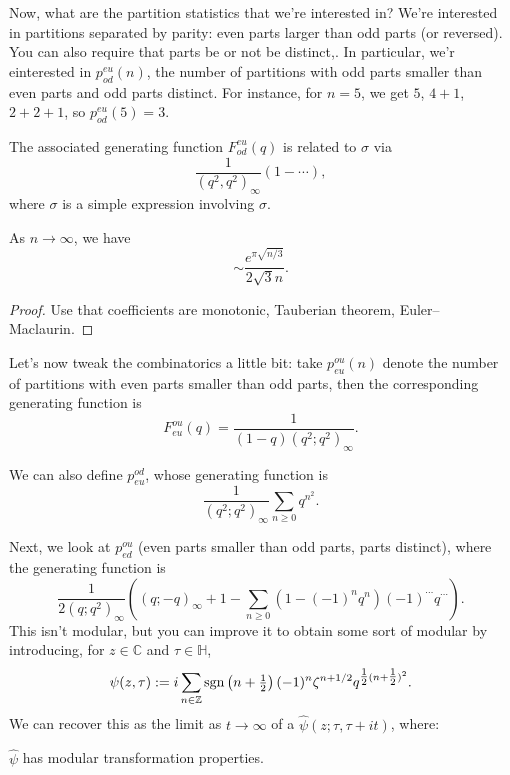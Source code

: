 \documentclass[reqno]{amsart} 
\begin{document}
Now, what are the partition statistics that we're interested in?  We're interested in partitions separated by parity: even parts larger than odd parts (or reversed).  You can also require that parts be or not be distinct,.  In particular, we'r einterested in $p_{o d}^{e u}(n)$, the number of partitions with odd parts smaller than even parts and odd parts distinct.  For instance, for $n = 5$, we get $5$, $4 + 1$, $2 + 2 + 1$, so $p_{o d}^{e u}(5) = 3$.

The associated generating function $F_{o d}^{e u}(q)$ is related to $\sigma$ via
\begin{equation*}
  \frac{1}{(q^2, q^2)_\infty} \left( 1 - \dotsb \right),
\end{equation*}
where $\sigma$ is a simple expression involving $\sigma$.

\begin{theorem}
  As $n \rightarrow \infty$, we have
  \begin{equation*}
    \sim \frac{e^{\pi \sqrt{n/3}}}{2 \sqrt{3} n}.
  \end{equation*}
\end{theorem}
\begin{proof}
  Use that coefficients are monotonic, Tauberian theorem, Euler--Maclaurin.
\end{proof}

Let's now tweak the combinatorics a little bit: take $p_{e u}^{o u}(n)$ denote the number of partitions with even parts smaller than odd parts, then the corresponding generating function is
\begin{equation*}
  F_{e u}^{o u}(q) =   \frac{1}{(1 - q)(q^2 ; q^2)_\infty}.
\end{equation*}

We can also define $p_{e u}^{o d}$, whose generating function is
\begin{equation*}
  \frac{1}{(q^2 ; q^2)_\infty} \sum_{n \geq 0} q^{n^2}.
\end{equation*}

Next, we look at $p_{e d}^{o u}$ (even parts smaller than odd parts, parts distinct), where the generating function is
\begin{equation*}
  \frac{1}{2(q; q^2)_\infty}
  \left((q; - q)_\infty + 1 - \sum_{n \geq 0}(1 -(- 1)^n q^n )(- 1)^{\dotsb} q^{\dotsb} \right).
\end{equation*}
This isn't modular, but you can improve it to obtain some sort of modular by introducing, for $z \in \mathbb{C}$ and $\tau \in \mathbb{H}$,
\begin{equation*}
  \psi(z, \tau) := i \sum_{n \in \mathbb{Z}} \operatorname{sgn} \left( n + \tfrac{1}{2} \right)(- 1)^n
  \zeta^{n + 1/2} q^{\tfrac{1}{2}(n + \tfrac{1}{2})^2}.  
\end{equation*}
We can recover this as the limit as $t \rightarrow \infty$ of a $\hat{\psi}(z; \tau, \tau + i t)$, where:
\begin{theorem}[B.--Nazaroglu]
  $\hat{\psi}$ has modular transformation properties.
\end{theorem}
\end{document}
